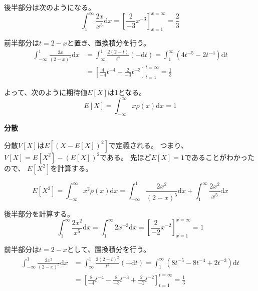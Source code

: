 \documentclass[12pt,b5paper]{ltjsarticle}
\begin{document}
\begin{enumerate}
      後半部分は次のようになる。
      \begin{equation}
       \int_{1}^{\infty} \frac{2x}{x^{5}} \mathrm{d}x
        = \left[ \frac{2}{-3}x^{-3} \right]_{x=1}^{x=\infty}
        = \frac{2}{3}
      \end{equation}

      前半部分は$t=2-x$と置き、置換積分を行う。
      \begin{align}
       \int_{-\infty}^{1} \frac{2x}{(2-x)^{5}} \mathrm{d}x
        &= \int_{\infty}^{1} \frac{2(2-t)}{t^{5}} (-\mathrm{d}t)
        = \int_{1}^{\infty} \left( 4t^{-5} -2t^{-4} \right) \mathrm{d}t\\
        &= \left[ \frac{4}{-4}t^{-4} -\frac{2}{-3}t^{-3}  \right]_{t=1}^{t=\infty}
        = \frac{1}{3}
      \end{align}

      よって、次のように期待値$E[X]$は1となる。
      \begin{equation}
       E[X] = \int_{-\infty}^{\infty} x\rho(x) \mathrm{d}x = 1
      \end{equation}

      \textbf{分散}

      分散$V[X]$は$E[(X-E[X])^{2}]$で定義される。
      つまり、
      $V[X]=E[X^{2}]-\left(E[X]\right)^{2}$である。
      先ほど$E[X]=1$であることがわかったので、
      $E[X^{2}]$を計算する。

      \begin{equation}
       E[X^{2}]
        = \int_{-\infty}^{\infty} x^{2}\rho(x) \mathrm{d}x
        = \int_{-\infty}^{1} \frac{2x^{2}}{(2-x)^{5}} \mathrm{d}x
        + \int_{1}^{\infty} \frac{2x^{2}}{x^{5}} \mathrm{d}x
      \end{equation}

      後半部分を計算する。
      \begin{equation}
       \int_{1}^{\infty} \frac{2x^{2}}{x^{5}} \mathrm{d}x
        = \int_{1}^{\infty} 2x^{-3} \mathrm{d}x
        = \left[\frac{2}{-2}x^{-2}\right]_{x=1}^{x=\infty}
        = 1
      \end{equation}

      前半部分は$t=2-x$として、置換積分を行う。
      \begin{align}
       \int_{-\infty}^{1} \frac{2x^{2}}{(2-x)^{5}} \mathrm{d}x
        &= \int_{\infty}^{1} \frac{2(2-t)^{2}}{t^{5}} (-\mathrm{d}t)
        = \int_{1}^{\infty} \left( 8t^{-5} -8t^{-4}+2t^{-3} \right) \mathrm{d}t\\
        &= \left[ \frac{8}{-4}t^{-4} -\frac{8}{-3}t^{-3} + \frac{2}{-2}t^{-2} \right]_{t=1}^{t=\infty}
        = \frac{1}{3}
      \end{align}


\end{enumerate}
\end{document}
